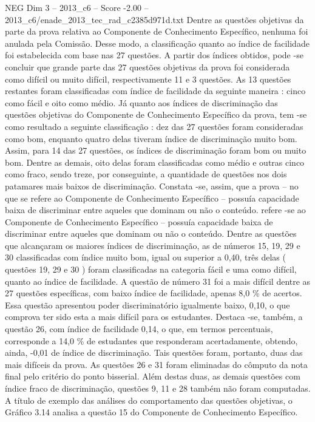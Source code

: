 \begin{textsample}{NEG Dim 3 – 2013\_c6 – Score -2.00 – 2013\_c6/enade\_2013\_tec\_rad\_c2385d971d.txt}
Dentre as questões objetivas da parte da prova relativa ao Componente de Conhecimento Específico, nenhuma foi anulada pela Comissão.
Desse modo, a classificação quanto ao índice de facilidade foi estabelecida com base nas 27 questões.
A partir dos índices obtidos, pode -se concluir que grande parte das 27 questões objetivas da prova foi considerada como difícil ou muito difícil, respectivamente 11 e 3 questões.
As 13 questões restantes foram classificadas com índice de facilidade da seguinte maneira : cinco como fácil e oito como médio.
Já quanto aos índices de discriminação das questões objetivas do Componente de Conhecimento Específico da prova, tem -se como resultado a seguinte classificação : dez das 27 questões foram consideradas como bom, enquanto quatro delas tiveram índice de discriminação muito bom.
Assim, para 14 das 27 questões, os índices de discriminação foram bom ou muito bom.
Dentre as demais, oito delas foram classificadas como médio e outras cinco como fraco, sendo treze, por conseguinte, a quantidade de questões nos dois patamares mais baixos de discriminação.
Constata -se, assim, que a prova – no que se refere ao Componente de Conhecimento Específico – possuía capacidade baixa de discriminar entre aqueles que dominam ou não o conteúdo. refere -se ao Componente de Conhecimento Específico – possuía capacidade baixa de discriminar entre aqueles que dominam ou não o conteúdo.
Dentre as questões que alcançaram os maiores índices de discriminação, as de números 15, 19, 29 e 30 classificadas com índice muito bom, igual ou superior a 0,40, três delas ( questões 19, 29 e 30 ) foram classificadas na categoria fácil e uma como difícil, quanto ao índice de facilidade.
A questão de número 31 foi a mais difícil dentre as 27 questões específicas, com baixo índice de facilidade, apenas 8,0 \% de acertos.
Essa questão apresentou poder discriminatório igualmente baixo, 0,10, o que comprova ter sido esta a mais difícil para os estudantes.
Destaca -se, também, a questão 26, com índice de facilidade 0,14, o que, em termos percentuais, corresponde a 14,0 \% de estudantes que responderam acertadamente, obtendo, ainda, -0,01 de índice de discriminação.
Tais questões foram, portanto, duas das mais difíceis da prova.
As questões 26 e 31 foram eliminadas do cômputo da nota final pelo critério do ponto bisserial.
Além destas duas, as demais questões com índice fraco de discriminação, questões 9, 11 e 28 também não foram computadas.
A título de exemplo das análises do comportamento das questões objetivas, o Gráfico 3.14 analisa a questão 15 do Componente de Conhecimento Específico.

\end{textsample}
